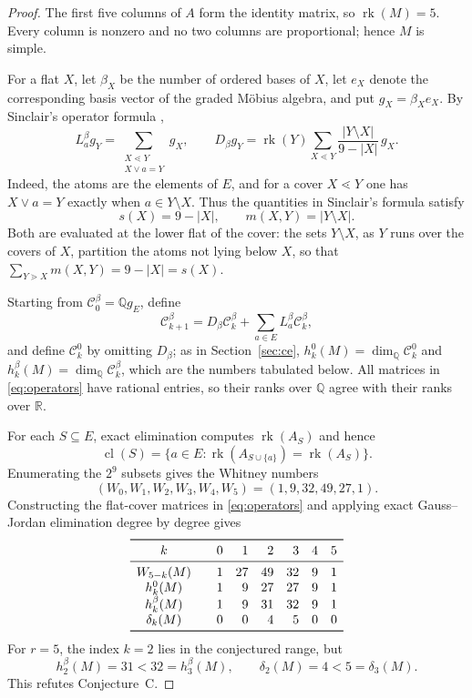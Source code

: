 \documentclass[11pt]{amsart}
\theoremstyle{remark}
\newcommand{\rk}{\operatorname{rk}}
\newcommand{\cl}{\operatorname{cl}}
\begin{document}
\begin{proof}
The first five columns of $A$ form the identity matrix, so $\rk(M)=5$.
Every column is nonzero and no two columns are proportional; hence $M$ is
simple.

For a flat $X$, let $\beta_X$ be the number of ordered bases of $X$, let
$e_X$ denote the corresponding basis vector of the graded M\"obius algebra,
and put $g_X=\beta_Xe_X$. By Sinclair's operator formula
\cite[Proposition~2.4]{Sinclair},
\begin{equation}\label{eq:operators}
L_a^\beta g_Y
 =\sum_{\substack{X\lessdot Y\\X\vee a=Y}}g_X,
\qquad
D_\beta g_Y
 =\rk(Y)\sum_{X\lessdot Y}
   \frac{|Y\setminus X|}{9-|X|}\,g_X.
\end{equation}
Indeed, the atoms are the elements of $E$, and for a cover
$X\lessdot Y$ one has $X\vee a=Y$ exactly when $a\in Y\setminus X$.
Thus the quantities in Sinclair's formula satisfy
\[
s(X)=9-|X|,
\qquad
m(X,Y)=|Y\setminus X|.
\]
Both are evaluated at the lower flat of the cover: the sets $Y\setminus X$,
as $Y$ runs over the covers of $X$, partition the atoms not lying below $X$,
so that $\sum_{Y\gtrdot X}m(X,Y)=9-|X|=s(X)$.

Starting from $\mathcal C_0^\beta=\mathbb Qg_E$, define
\begin{equation}\label{eq:chain}
\mathcal C_{k+1}^\beta
 =D_\beta\mathcal C_k^\beta
  +\sum_{a\in E}L_a^\beta\mathcal C_k^\beta,
\end{equation}
and define $\mathcal C_k^0$ by omitting $D_\beta$; as in
Section~\ref{sec:ce}, $h_k^0(M)=\dim_{\mathbb Q}\mathcal C_k^0$ and
$h_k^\beta(M)=\dim_{\mathbb Q}\mathcal C_k^\beta$, which are the numbers
tabulated below. All matrices in \eqref{eq:operators} have rational entries,
so their ranks over $\mathbb Q$ agree with their ranks over $\mathbb R$.

For each $S\subseteq E$, exact elimination computes $\rk(A_S)$ and hence
\[
\cl(S)=\{a\in E:\rk(A_{S\cup\{a\}})=\rk(A_S)\}.
\]
Enumerating the $2^9$ subsets gives the Whitney numbers
\[
(W_0,W_1,W_2,W_3,W_4,W_5)=(1,9,32,49,27,1).
\]
Constructing the flat-cover matrices in \eqref{eq:operators} and applying
exact Gauss--Jordan elimination degree by degree gives
\[
\begin{array}{c@{\qquad}rrrrrr}
\toprule
k&0&1&2&3&4&5\\
\midrule
W_{5-k}(M)&1&27&49&32&9&1\\
h_k^0(M)&1&9&27&27&9&1\\
h_k^\beta(M)&1&9&31&32&9&1\\
\delta_k(M)&0&0&4&5&0&0\\
\bottomrule
\end{array}
\]
For $r=5$, the index $k=2$ lies in the conjectured range, but
\[
h_2^\beta(M)=31<32=h_3^\beta(M),
\qquad
\delta_2(M)=4<5=\delta_3(M).
\]
This refutes Conjecture~C.
\end{proof}
\end{document}
